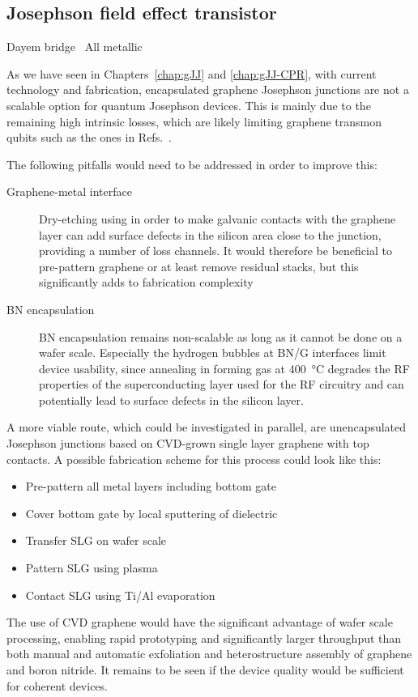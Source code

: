 \subsection{Josephson field effect transistor}

Dayem bridge~\cite{paolucciMagnetotransportExperimentsFully2019}
All metallic~\cite{desimoniMetallicSupercurrentFieldeffect2018}

As we have seen in Chapters~\ref{chap:gJJ} and \ref{chap:gJJ-CPR}, with current technology and fabrication, encapsulated graphene Josephson junctions are not a scalable option for quantum Josephson devices.
%
This is mainly due to the remaining high intrinsic losses, which are likely limiting graphene transmon qubits such as the ones in Refs.~\cite{krollMagneticFieldCompatible2018,wangCoherentControlHybrid2019}.

The following pitfalls would need to be addressed in order to improve this:
\begin{description}
	\item[Graphene-metal interface] Dry-etching using  in order to make galvanic contacts with the graphene layer can add surface defects in the silicon area close to the junction, providing a number of loss channels.
	It would therefore be beneficial to pre-pattern graphene or at least remove residual stacks, but this significantly adds to fabrication complexity
	\item[BN encapsulation] BN encapsulation remains non-scalable as long as it cannot be done on a wafer scale.
	Especially the hydrogen bubbles at BN/G interfaces limit device usability, since annealing in forming gas at \SI{400}{\celsius} degrades the RF properties of the superconducting layer used for the RF circuitry and can potentially lead to surface defects in the silicon layer.
\end{description}

A more viable route, which could be investigated in parallel, are unencapsulated Josephson junctions based on CVD-grown single layer graphene with top contacts.
%
A possible fabrication scheme for this process could look like this:
%
\begin{itemize}
	\item Pre-pattern all metal layers including bottom gate
	\item Cover bottom gate by local sputtering of dielectric
	\item Transfer SLG on wafer scale
	\item Pattern SLG using  plasma
	\item Contact SLG using Ti/Al evaporation
\end{itemize}
%
The use of CVD graphene would have the significant advantage of wafer scale processing, enabling rapid prototyping and significantly larger throughput than both manual and automatic exfoliation and heterostructure assembly of graphene and boron nitride.
%
It remains to be seen if the device quality would be sufficient for coherent devices.

